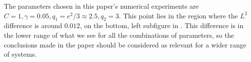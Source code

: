\documentclass[main.tex]{subfiles}
\begin{document}
The parameters chosen in this paper's numerical experiments
are $C=1,\gamma=0.05,q_1=e^2/3\approx2.5,q_2=3$. This point lies
in the region where the $L^2$ difference is around $0.012$, on the
bottom, left subfigure in .
This difference is in the lower range of what we see for all the
combinations of parameters, so the conclusions made in the paper
should be considered as relevant for a wider range of systems.

\biblio
\end{document}
